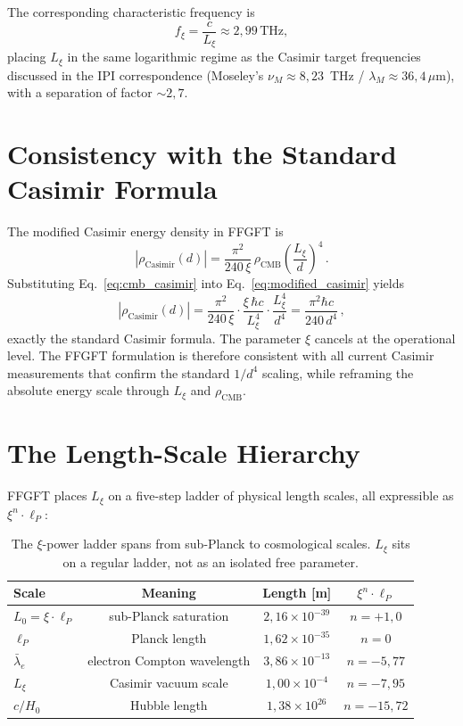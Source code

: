 \documentclass[11pt,a4paper]{article}
\begin{document}
The corresponding characteristic frequency is
\[
f_\xi = \frac{c}{L_\xi} \approx 2{,}99\,\text{THz},
\]
placing $L_\xi$ in the same logarithmic regime as the Casimir target frequencies discussed in the IPI correspondence (Moseley's $\nu_M \approx 8{,}23$~THz / $\lambda_M \approx 36{,}4\,\mu$m), with a separation of factor $\sim 2{,}7$.

\section{Consistency with the Standard Casimir Formula}

The modified Casimir energy density in FFGFT is
\begin{equation}
|\rho_{\mathrm{Casimir}}(d)| = \frac{\pi^2}{240\,\xi}\,\rho_{\mathrm{CMB}}\left(\frac{L_\xi}{d}\right)^4\,.
\label{eq:modified_casimir}
\end{equation}
Substituting Eq.~\eqref{eq:cmb_casimir} into Eq.~\eqref{eq:modified_casimir} yields
\begin{equation}
|\rho_{\mathrm{Casimir}}(d)| = \frac{\pi^2}{240\,\xi}\cdot\frac{\xi\,\hbar c}{L_\xi^4}\cdot\frac{L_\xi^4}{d^4} = \frac{\pi^2 \hbar c}{240\,d^4}\,,
\end{equation}
exactly the standard Casimir formula. The parameter $\xi$ cancels at the operational level. The FFGFT formulation is therefore consistent with all current Casimir measurements that confirm the standard $1/d^4$ scaling, while reframing the absolute energy scale through $L_\xi$ and $\rho_{\mathrm{CMB}}$.

\section{The Length-Scale Hierarchy}

FFGFT places $L_\xi$ on a five-step ladder of physical length scales, all expressible as $\xi^n \cdot \ell_P$:

\begin{table}[h]
\centering
\small
\begin{tabular}{lccc}
\toprule
\textbf{Scale} & \textbf{Meaning} & \textbf{Length [m]} & $\xi^n \cdot \ell_P$ \\
\midrule
$L_0 = \xi \cdot \ell_P$ & sub-Planck saturation & $2{,}16 \times 10^{-39}$ & $n = +1{,}0$ \\
$\ell_P$ & Planck length & $1{,}62 \times 10^{-35}$ & $n = 0$ \\
$\bar\lambda_e$ & electron Compton wavelength & $3{,}86 \times 10^{-13}$ & $n = -5{,}77$ \\
$L_\xi$ & Casimir vacuum scale & $1{,}00 \times 10^{-4}$ & $n = -7{,}95$ \\
$c/H_0$ & Hubble length & $1{,}38 \times 10^{26}$ & $n = -15{,}72$ \\
\bottomrule
\end{tabular}
\caption{The $\xi$-power ladder spans from sub-Planck to cosmological scales. $L_\xi$ sits on a regular ladder, not as an isolated free parameter.}
\end{table}
\end{document}
